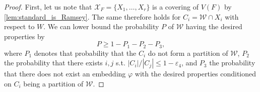 \documentclass[a4paper,11pt]{article}
\numberwithin{equation}{section}
\newcommand{\mX}{\mathcal{X}}
\begin{document}
\begin{proof}
    First, let us note that $\mX_F = \{X_1,\dots, X_{r}\}$ is a covering of $V(F)$ by \cref{lem:standard_is_Ramsey}. The same therefore holds for $C_i = \mathscr W \cap X_i$ with respect to $W$. We can lower bound the probability $P$ of $\mathscr W$ having the desired properties by
    \begin{equation} \label{eq:p}
        P \geq 1 - P_1 - P_2 - P_3,
    \end{equation}
    where $P_1$ denotes that probability that the $C_i$ do not form a partition of $\mathscr W$, $P_2$ the probability that there exists $i,j$ s.t. $|C_i| / |C_j| \le 1- \varepsilon_4$, and $P_3$ the probability that there does not exist an embedding $\varphi$ with the desired properties conditioned on $C_i$ being a partition of $\mathscr W$.


\end{proof}
\end{document}
